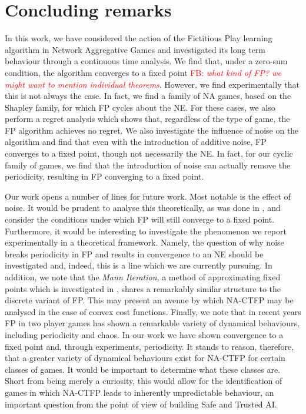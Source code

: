 \documentclass{article}
\theoremstyle{definition}
\newcommand{\fb}[1]{\textcolor{red}{FB: \textit{#1}}}
\begin{document}
\section{Concluding remarks}
	In this work, we have considered the action of the Fictitious Play learning algorithm in Network Aggregative Games and investigated its long term behaviour through a continuous time analysis. We find that, under a zero-sum condition, the algorithm converges to a fixed point \fb{what kind of FP? we might want to mention individual theorems}. However, we find experimentally that this is not always the case. In fact, we find a family of NA games, based on the Shapley family, for which FP cycles about the NE. For these cases, we also perform a regret analysis which shows that, regardless of the type of game, the FP algorithm achieves no regret. 
%	
	We also investigate the influence of noise on the algorithm and find that even with the introduction of additive noise, FP converges to a fixed point, though not necessarily the NE. In fact, for our cyclic family of games, we find that the introduction of noise can actually remove the periodicity, resulting in FP converging to a fixed point.
	
	Our work opens a number of lines for future work. Most notable is the effect of noise. It would be prudent to analyse this theoretically, as was done in \cite{Perrin2020}, and consider the conditions under which FP will still converge to a fixed point. Furthermore, it would be interesting to investigate the phenomenon we report experimentally in a theoretical framework. Namely, the question of why noise breaks periodicity in FP and results in convergence to an NE should be investigated and, indeed, this is a line which we are currently pursuing.
%	
	In addition, we note that the \emph{Mann Iteration}, a method of approximating fixed points which is investigated in \cite{Parise2020}, shares a remarkably similar structure to the discrete variant of FP. This may present an avenue by which NA-CTFP may be analysed in the case of convex cost functions. 
%	
	Finally, we note that in recent years FP in two player games has shown a remarkable variety of dynamical behaviours, including periodicity and chaos. In our work we have shown convergence to a fixed point and, through experiments, periodicity. It stands to reason, therefore, that a greater variety of dynamical behaviours exist for NA-CTFP for certain classes of games. It would be important to determine what these classes are. Short from being merely a curiosity, this would allow for the identification of games in which NA-CTFP leads to inherently unpredictable behaviour, an important question from the point of view of building Safe and Trusted AI.
\end{document}
